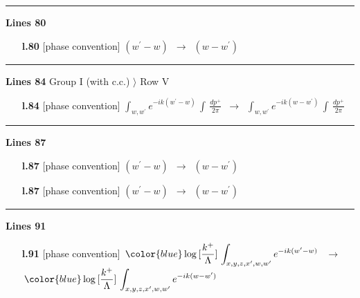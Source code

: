 \documentclass[10pt]{article}
\begin{document}
\noindent\rule{\linewidth}{0.3pt}\par\noindent\textbf{Lines 80} \par
\begin{itemize}[leftmargin=2.2em,itemsep=1pt,topsep=2pt]
\item[\textbf{l.80}] \textsf{\small [phase convention]} $\displaystyle (w^\prime-w)$\ $\longrightarrow$\ $\displaystyle (w-w^\prime)$
\end{itemize}
\noindent\rule{\linewidth}{0.3pt}\par\noindent\textbf{Lines 84} \quad \textsf{Group I (with c.c.) $\rangle$ Row V} \par
\begin{itemize}[leftmargin=2.2em,itemsep=1pt,topsep=2pt]
\item[\textbf{l.84}] \textsf{\small [phase convention]} $\displaystyle \int_{w, w^\prime} e^{-ik(w^\prime-w)}\, \int\, \frac{dp^{+}}{2\pi}$\ $\longrightarrow$\ $\displaystyle \int_{w, w^\prime} e^{-ik(w-w^\prime)}\, \int\, \frac{dp^{+}}{2\pi}$
\end{itemize}
\noindent\rule{\linewidth}{0.3pt}\par\noindent\textbf{Lines 87} \par
\begin{itemize}[leftmargin=2.2em,itemsep=1pt,topsep=2pt]
\item[\textbf{l.87}] \textsf{\small [phase convention]} $\displaystyle (w^\prime-w)$\ $\longrightarrow$\ $\displaystyle (w-w^\prime)$
\item[\textbf{l.87}] \textsf{\small [phase convention]} $\displaystyle (w^\prime-w)$\ $\longrightarrow$\ $\displaystyle (w-w^\prime)$
\end{itemize}
\noindent\rule{\linewidth}{0.3pt}\par\noindent\textbf{Lines 91} \par
\begin{itemize}[leftmargin=2.2em,itemsep=1pt,topsep=2pt]
\item[\textbf{l.91}] \textsf{\small [phase convention]} $\displaystyle \, {\color{blue}\log{[\frac{k^{+}}{\Lambda}]}}\,\int_{x,y,z,x^{\prime},w,w^{\prime}}e^{-ik(w^{\prime}-w)}\,$\ $\longrightarrow$\ $\displaystyle \, {\color{blue}\log{[\frac{k^{+}}{\Lambda}]}}\,\int_{x,y,z,x^{\prime},w,w^{\prime}}e^{-ik(w-w^{\prime})}\,$
\end{itemize}
\end{document}
